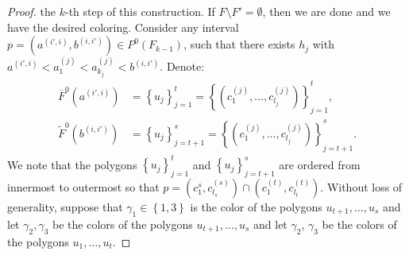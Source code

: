 \documentclass[12pt]{article}
\theoremstyle{definition}
\begin{document}
\begin{proof}
         the $k$-th step of this
         construction.
         If $F \setminus F' = \emptyset$,
         then we are done and we have
         the desired coloring.
         Consider any interval
         $p = \left(a^{\left(i', i\right)},
         b^{\left(i, i'\right)}\right)
         \in P^{0}\left(F_{k-1}\right)$,
         such that there
         exists $h_{j}$ with
         $a^{\left(i', i\right)} <
         a_1^{\left(j\right)} < a_{k_{j}}^{\left(j\right)}
         < b^{\left(i, i'\right)}$.
         Denote:
         \begin{align*}
             \overline{F}^{0}\left(a^{\left(i', i\right)}\right) &= 
             \left\{u_{j}\right\}_{j = 1}^{t} = 
             \left\{\left(c_1^{\left(j\right)}, \ldots, 
             c_{l_{j}}^{\left(j\right)}\right)\right\}_{j =1}^{t}, \\
             \widetilde{F}^{0}\left(b^{\left(i, i'\right)}\right) &= 
             \left\{u_{j}\right\}_{j = t+1}^{s} = 
             \left\{\left(c_1^{\left(j\right)}, \ldots,
             c_{l_{j}}^{\left(j\right)}\right)\right\}_{j =t +1}^{s}.
         \end{align*}
         We note that the polygons
         $\left\{u_{j}\right\}_{j=1}^{t}$ 
         and $\left\{u_{j}\right\}_{j=t+1}^{s}$ 
         are ordered from innermost
         to outermost so that
         $p = \left(c_1^{s}, c_{l_{s}}^{\left(s\right)}\right)
         \cap \left(c_1^{\left(t\right)},
         c_{l_{t}}^{\left(t\right)}\right)$.
         Without loss of generality,
         suppose that $\gamma_1 \in 
         \left\{1, 3\right\}$ is the
         color of the polygons 
         $u_{t+1}, \ldots, u_{s}$ 
         and let $\gamma_2, \gamma_3$
         be the colors of the polygons
         $u_{t+1}, \ldots, u_{s}$ 
         and let $\gamma_2$, $\gamma_3$
         be the colors of the polygons
         $u_1, \ldots, u_{t}$.
         

\end{proof}
\end{document}
